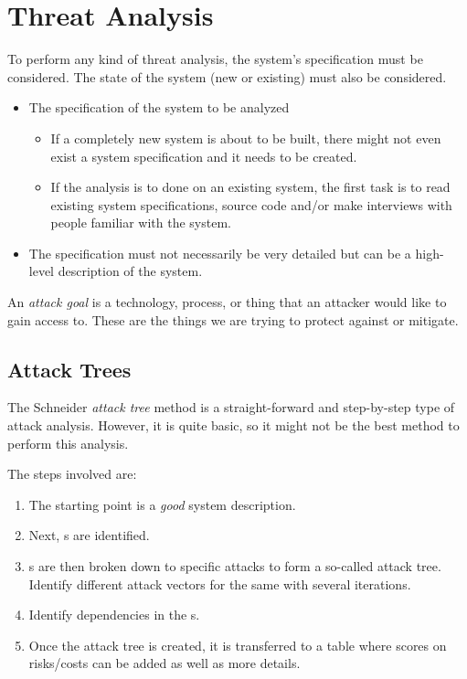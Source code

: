\section{Threat Analysis}\label{sec:Threat_Analysis}
To perform any kind of threat analysis, the system's specification must be considered.
The state of the system (new or existing) must also be considered.
\begin{itemize}[noitemsep]
\item The specification of the system to be analyzed
  \begin{itemize}[noitemsep]
  \item If a completely new system is about to be built, there might not even exist a system specification and it needs to be created.
  \item If the analysis is to done on an existing system, the first task is to read existing system specifications, source code and/or make interviews with people familiar with the system.
  \end{itemize}

\item The specification must not necessarily be very detailed but can be a high-level description of the system.
\end{itemize}

\begin{definition}\label{def:Attack_Goal}
  An \emph{attack goal} is a technology, process, or thing that an attacker would like to gain access to.
  These are the things we are trying to protect against or mitigate.
\end{definition}

\subsection{Attack Trees}\label{subsec:Attack_Trees}
\begin{definition}\label{def:Attack_Tree}
  The Schneider \emph{attack tree} method is a straight-forward and step-by-step type of attack analysis.
  However, it is quite basic, so it might not be the best method to perform this analysis.

  The steps involved are:
  \begin{enumerate}[noitemsep]
  \item The starting point is a \emph{good} system description.
  \item Next, s are identified.
  \item {}s are then broken down to specific attacks to form a so-called attack tree. Identify different attack vectors for the same  with several iterations.
  \item Identify dependencies in the s.
  \item Once the attack tree is created, it is transferred to a table where scores on risks/costs can be added as well as more details.
  \end{enumerate}
\end{definition}

